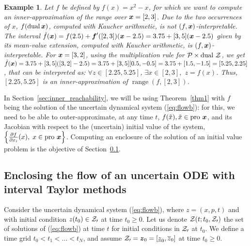 \documentclass{sig-alternate-05-2015}
\newtheorem{example}{Example}
\DeclareMathOperator{\range}{range}
\newcommand{\dual}{\mbox{dual }}
\newcommand{\pro}{\mbox{pro }}
\begin{document}
\begin{example}
Let $f$ be defined by $f(x)=x^2-x$, for which we want to compute an inner-approximation of the range over $\x=[2,3]$. Due to the
two occurrences of $x$, $f(\mbox{dual}\, \x)$, computed with Kaucher arithmetic, 
is not  $(f,\x)$-interpretable. The interval $\tilde{f}(\x) = f(2.5) + \f'([2,3]) (\x - 2.5)=3.75 + [3,5](\x - 2.5)$
given by its mean-value extension, computed with Kaucher arithmetic, is $(f,\x)$-interpretable. 
For  $\x=[3,2]$, using the multiplication rule for ${\cal P} \times \dual {\cal Z}$, we get 
$\tilde{f}(\x) = 3.75 + [3,5]([3,2] - 2.5)=  3.75 + [3,5] [0.5,-0.5] = 3.75 + [1.5,-1.5] = [5.25,2.25]$, that can be interpreted 
as: $\forall z \in [2.25,5.25]$, $\exists x \in [2,3],$  $z=f(x)$. Thus, $[2.25,5.25]$ is an inner-approximation of $\range(f,[2,3])$.
\end{example}

In Section~\ref{sec:inner_reachability}, we will be using Theorem~\ref{thm1} with $f$ being the solution of the uncertain dynamical system 
(\ref{eq:flowb}): for this, we need to be able to outer-approximate, at any time $t$, $f(\tilde x), \tilde x \in \pro \x$, 
and its Jacobian with respect to the (uncertain) initial value of the system, $\left\{ \frac{\partial f}{\partial x_i} (x), \; x \in \pro \x \right\}$.
Computing an enclosure of the solution of an initial value problem is the objective of Section~\ref{sec:Taylor}.  

\subsection{Enclosing the flow of an uncertain ODE with interval Taylor methods}
\label{sec:Taylor}
Consider the uncertain dynamical system (\ref{eq:flowb}), where $z=(x,p,t)$ and with initial condition 
$z(t_0) \in {\cal Z_0}$ at time $t_0 \geq 0$. Let us denote ${\cal Z}(t;t_0, {\cal Z_0})$ the set of solutions of  (\ref{eq:flowb}) 
at time $t$ for initial conditions in ${\cal Z_0}$ at $t_0$. We define a time grid $t_0 < t_1 < \ldots < t_N$, and assume
${\cal Z_0} = \z_0=[\underline{z}_0,\overline{z}_0]$ at time $t_0 \geq 0$. 
\end{document}
